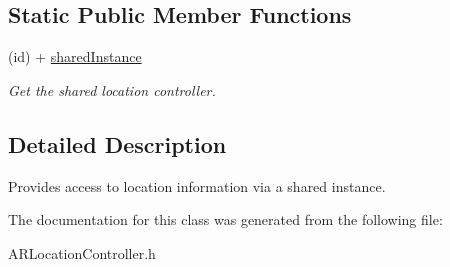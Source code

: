 \subsection*{Static Public Member Functions}
\begin{DoxyCompactItemize}
\item 
\hypertarget{interface_a_r_location_controller_a7667cf3d4be0d3aa33942ace003f54ae}{(id) + \hyperlink{interface_a_r_location_controller_a7667cf3d4be0d3aa33942ace003f54ae}{shared\-Instance}}\label{interface_a_r_location_controller_a7667cf3d4be0d3aa33942ace003f54ae}

\begin{DoxyCompactList}\small\item\em Get the shared location controller. \end{DoxyCompactList}\end{DoxyCompactItemize}


\subsection{Detailed Description}
Provides access to location information via a shared instance. 

The documentation for this class was generated from the following file\-:\begin{DoxyCompactItemize}
\item 
A\-R\-Location\-Controller.\-h\end{DoxyCompactItemize}
